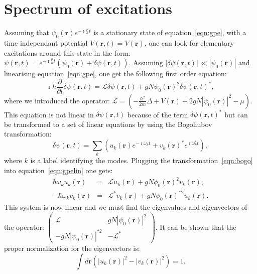 \documentclass[12pt,a4paper]{report}
\newcommand{\abs}[1]{\left|#1\right|}
\begin{document}
\section{Spectrum of excitations}
Assuming that $\psi_0(\bm{r})e^{-\imath\frac{\mu}{\hbar}t}$ is a stationary state of equation~\eqref{eqn:gpe}, with a time independant potential $V(\bm{r},t)=V(\bm{r})$, one can look for elementary excitations around this state in the form: $\psi(\bm{r},t)=e^{-\imath\frac{\mu}{\hbar}t}
\left(\psi_0(\bm{r})+\delta\psi(\bm{r},t)\right)$.
Assuming $\abs{\delta\psi(\bm{r},t)}\ll\abs{\psi_0(\bm{r})}$ and linearising equation~\eqref{eqn:gpe}, one get the following first order equation:
\begin{equation}
\imath\hbar\frac{\partial}{\partial t}\delta\psi(\bm{r},t)
=\mathcal{L}\delta\psi(\bm{r},t)+gN\psi_0(\bm{r})^2\delta\psi(\bm{r},t)^*,
\label{eqn:gpelin}
\end{equation}
where we introduced the operator:
$\mathcal{L}=\left(-\frac{\hbar^2}{2m}\Delta+V(\bm{r})+2gN\abs{\psi_0(\bm{r})}^2-\mu\right)$.
This equation is not linear in $\delta\psi(\bm{r},t)$ because of the term $\delta\psi(\bm{r},t)^*$ but can be transformed to a set of linear equations by using the Bogoliubov transformation:
\begin{equation}
\delta\psi(\bm{r},t)=\sum_k\left(u_k(\bm{r})e^{-\imath\omega_kt}
+v_k(\bm{r})^*e^{\imath\omega_k^*t}\right),
\label{eqn:bogo}
\end{equation}
where $k$ is a label identifying the modes.
Plugging the transformation~\eqref{eqn:bogo} into equation~\eqref{eqn:gpelin} one gets:
\begin{subequations}
\begin{eqnarray}
\hbar\omega_ku_k(\bm{r})&=&\mathcal{L}u_k(\bm{r})+gN\phi_0(\bm{r})^2v_k(\bm{r}),\\
-\hbar\omega_kv_k(\bm{r})&=&\mathcal{L}^*v_k(\bm{r})+gN\phi_0(\bm{r})^{*2}u_k(\bm{r}).
\end{eqnarray}
\end{subequations}
This system is now linear and we must find the eigenvalues and eigenvectors of the operator: $\begin{pmatrix}
\mathcal{L} & gN\abs{\psi_0(\bm{r})}^2\\
-gN\abs{\psi_0(\bm{r})}^{*2} & -\mathcal{L}^*
\end{pmatrix}$.
It can be shown that the proper normalization for the eigenvectors is:
\begin{equation}
\int d\bm{r}\left(\abs{u_k(\bm{r})}^2-\abs{v_k(\bm{r})}^2\right)=1.
\end{equation}
\end{document}
